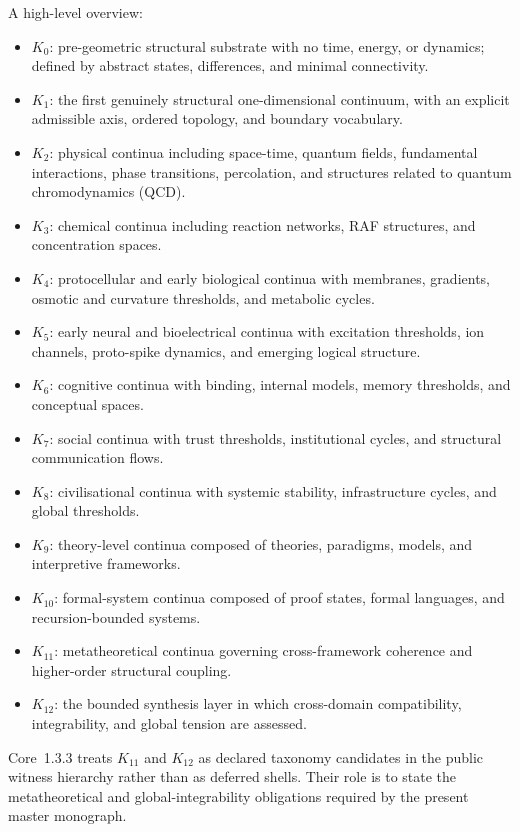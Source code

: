 A high-level overview:

\begin{itemize}
    \item \(K_0\): pre-geometric structural substrate with no time, energy, or dynamics; defined by abstract states, differences, and minimal connectivity.
    \item \(K_1\): the first genuinely structural one-dimensional continuum, with an explicit admissible axis, ordered topology, and boundary vocabulary.
    \item \(K_2\): physical continua including space-time, quantum fields, fundamental interactions, phase transitions, percolation, and structures related to quantum chromodynamics (QCD).
    \item \(K_3\): chemical continua including reaction networks, RAF structures, and concentration spaces.
    \item \(K_4\): protocellular and early biological continua with membranes, gradients, osmotic and curvature thresholds, and metabolic cycles.
    \item \(K_5\): early neural and bioelectrical continua with excitation thresholds, ion channels, proto-spike dynamics, and emerging logical structure.
    \item \(K_6\): cognitive continua with binding, internal models, memory thresholds, and conceptual spaces.
    \item \(K_7\): social continua with trust thresholds, institutional cycles, and structural communication flows.
    \item \(K_8\): civilisational continua with systemic stability, infrastructure cycles, and global thresholds.
    \item \(K_9\): theory-level continua composed of theories, paradigms, models, and interpretive frameworks.
    \item \(K_{10}\): formal-system continua composed of proof states, formal languages, and recursion-bounded systems.
    \item \(K_{11}\): metatheoretical continua governing cross-framework coherence and higher-order structural coupling.
    \item \(K_{12}\): the bounded synthesis layer in which cross-domain compatibility, integrability, and global tension are assessed.
\end{itemize}

Core~1.3.3 treats \(K_{11}\) and \(K_{12}\) as declared taxonomy candidates in the public witness hierarchy rather than as deferred shells. Their role is to state the metatheoretical and global-integrability obligations required by the present master
monograph.

